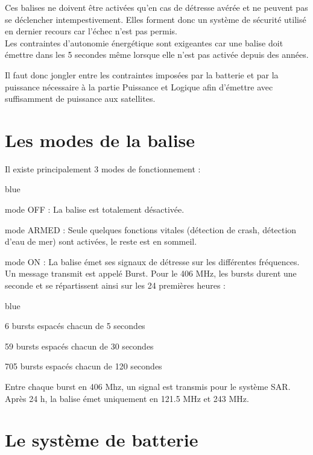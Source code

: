 
Ces balises ne doivent être activées qu'en cas de détresse avérée et ne peuvent pas se déclencher intempestivement. Elles forment donc un système de sécurité utilisé en dernier recours car l'échec n'est pas permis.\\
Les contraintes d'autonomie énergétique sont exigeantes car une balise doit émettre dans les 5 secondes même lorsque elle n'est pas activée depuis des années.


Il faut donc jongler entre les contraintes imposées par la batterie et par la puissance nécessaire à la partie Puissance et Logique afin d'émettre avec suffisamment de puissance aux satellites. 

\section{Les modes de la balise}
\label{frequencies}

Il existe principalement 3 modes de fonctionnement :

\begin{items}{blue}{\Circle}
    \item mode OFF : La balise est totalement désactivée.
    \item mode ARMED : Seule quelques fonctions vitales (détection de crash, détection d'eau de mer) sont activées, le reste est en sommeil.
    \item mode ON : La balise émet ses signaux de détresse sur les différentes fréquences. Un message transmit est appelé Burst. Pour le 406 MHz, les bursts durent une seconde et se répartissent ainsi sur les 24 premières heures : 
     \begin{items}{blue}{\Triangle}
 \item 6 bursts espacés chacun de 5 secondes
 \item 59 bursts espacés chacun de 30 secondes
 \item 705 bursts espacés chacun de 120 secondes
 \end{items}
 
 Entre chaque burst en 406 Mhz, un signal est transmis pour le système SAR. Après 24 h, la balise émet uniquement en 121.5 MHz et 243 MHz.
\end{items}

\section{Le système de batterie}

